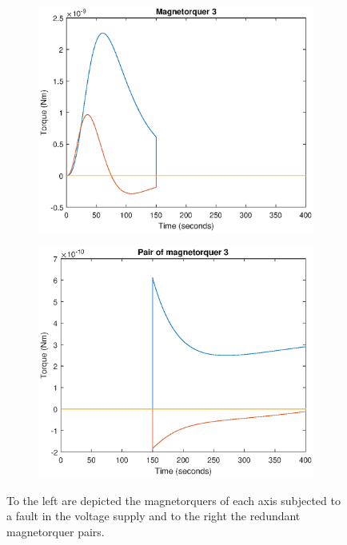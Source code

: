 \begin{figure}[H]
\begin{subfigure}{0.5\linewidth}
	\includegraphics[width=1\linewidth]{figures/config3.eps}
	\label{fig:fig:magcompens33}
\end{subfigure}
\begin{subfigure}{0.5\linewidth}
	\centering
	\includegraphics[width=1\linewidth]{figures/config33.eps}
	\label{fig:fig:magcompens43}	
\end{subfigure}
	\caption{To the left are depicted the magnetorquers of each axis subjected to a fault in the voltage supply and to the right the redundant magnetorquer pairs.}
	\label{fig:magneticconfig}
\end{figure}


